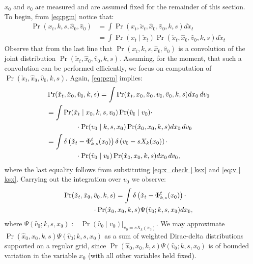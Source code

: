 \documentclass[letterpaper,10pt,conference]{ieeetran}
\begin{document}
$\hat{x}_0$ and $\hat{v}_0$ are measured and are assumed fixed for the remainder of this section.
To begin, from \eqref{eq:pgm}  notice that:
\begin{align}
	\Pr( x_t, k,s,\hat{x}_0, \hat{v}_0) &= \int \Pr( x_t, \check{x}_t , \hat{x}_0, \hat{v}_0, k,s) d\check{x}_t  \label{eq:convolve} \\
	&= \int \Pr( x_t \mid \check{x}_t ) \Pr(\check{x}_t , \hat{x}_0, \hat{v}_0, k,s) d\check{x}_t \nonumber
\end{align}
Observe that from the last line that $\Pr( x_t, k,s, \hat{x}_0, \hat{v}_0)$ is a convolution of the joint distribution $\Pr( \check{x}_t , \hat{x}_0, \hat{v}_0, k,s)$.
Assuming, for the moment, that such a convolution can be performed efficiently, we focus on computation of $\Pr( \check{x}_t , \hat{x}_0, \hat{v}_0, k,s)$.
Again, \eqref{eq:pgm} implies:
\begin{align}
	&\Pr( \check{x}_t , \hat{x}_0, \hat{v}_0, k,s) =\int \Pr( \check{x}_t , x_0, \hat{x}_0, v_0, \hat{v}_0, k,s) dx_0 \, dv_0 \nonumber \\
	&= \int \Pr( \check{x}_t \mid  x_0, k,s, v_0) \Pr( \hat{v}_0 \mid v_0) \cdot \\
	& \hspace{10ex}  \cdot \Pr( v_0 \mid k,s,x_0) \Pr(\hat{x}_0, x_0, k, s) dx_0 \, dv_0 \nonumber \\
		&= \int \delta\left( \check{x}_t - \Phi_{k,s}^{t}( x_0) \right) \delta\left( v_0 - s X_k (x_0) \right) \cdot \\
		&\hspace{10ex} \cdot\Pr( \hat{v}_0 \mid v_0) \Pr(\hat{x}_0, x_0,k, s) dx_0\, dv_0, \nonumber
\end{align}
where the last equality follows from substituting \eqref{eq:x_check | ksx} and \eqref{eq:v | ksx}.
 Carrying out the integration over $v_0$ we observe:
\begin{align}
\begin{split}
	&\Pr( \check{x}_t , \hat{x}_0, \hat{v}_0, k,s) = \int \delta\left( \check{x}_t - \Phi_{k,s}^{t}( x_0) \right)  \cdot \\
	&\hspace{10ex} \cdot \Pr(\hat{x}_0, x_0, k, s) \Psi(\hat{v}_0 ;k,s,x_0) dx_0,
\end{split}
\label{eq:push forward}
\end{align}
 where $\Psi( \hat{v}_0 ;k,s,x_0) := \left. \Pr( \hat{v}_0 \mid v_0) \right|_{v_0 = s X_k(x_0)}$.
 We may approximate $\Pr(\hat{x}_0, x_0, k, s) \Psi( \hat{v}_0 ; k, s, x_0)$ as a sum of weighted Dirac-delta distributions supported on a regular grid, since $\Pr(\hat{x}_0, x_0, k, s) \Psi( \hat{v}_0 ; k, s, x_0)$  is of bounded variation in the variable $x_0$ (with all other variables held fixed).
 
\end{document}

